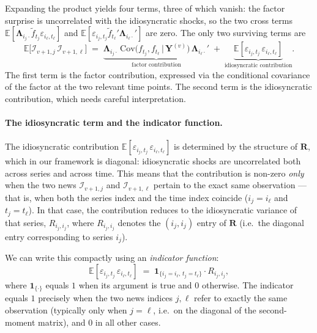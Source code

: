 \documentclass[11pt, a4paper, oneside]{article}
\begin{document}
Expanding the product yields four terms, three of which vanish: the
factor surprise is uncorrelated with the idiosyncratic shocks, so
the two cross terms
$\mathbb{E}[\boldsymbol{\Lambda}_{i_j \cdot} \widetilde{f}_{t_j} \varepsilon_{i_\ell, t_\ell}]$
and
$\mathbb{E}[\varepsilon_{i_j, t_j} \widetilde{f}_{t_\ell}' \boldsymbol{\Lambda}_{i_\ell \cdot}']$
are zero. The only two surviving terms are
\begin{equation}
\mathbb{E}\!\big[\mathcal{I}_{v+1, j}\, \mathcal{I}_{v+1, \ell}\big] \;=\;
\underbrace{\boldsymbol{\Lambda}_{i_j \cdot} \,
\mathrm{Cov}\!\big(f_{t_j}, f_{t_\ell} \,\big|\, \mathbf{Y}^{(v)}\big) \,
\boldsymbol{\Lambda}_{i_\ell \cdot}'}_{\text{factor contribution}}
\;+\;
\underbrace{\mathbb{E}[\varepsilon_{i_j, t_j}\, \varepsilon_{i_\ell, t_\ell}]}_{\text{idiosyncratic contribution}}.
\label{eq:second-moment-news-expanded}
\end{equation}
The first term is the factor contribution, expressed via the
conditional covariance of the factor at the two relevant time
points. The second term is the idiosyncratic contribution, which
needs careful interpretation.

\paragraph{The idiosyncratic term and the indicator function.}
The idiosyncratic contribution
$\mathbb{E}[\varepsilon_{i_j, t_j}\, \varepsilon_{i_\ell, t_\ell}]$
is determined by the structure of $\mathbf{R}$, which in our
framework is diagonal: idiosyncratic shocks are uncorrelated both
across series and across time. This means that the contribution is
non-zero \emph{only} when the two news $\mathcal{I}_{v+1, j}$ and
$\mathcal{I}_{v+1, \ell}$ pertain to the exact same observation —
that is, when both the series index and the time index coincide
($i_j = i_\ell$ and $t_j = t_\ell$). In that case, the contribution
reduces to the idiosyncratic variance of that series,
$R_{i_j, i_j}$, where $R_{i_j, i_j}$ denotes the $(i_j, i_j)$ entry
of $\mathbf{R}$ (i.e.\ the diagonal entry corresponding to series
$i_j$).

We can write this compactly using an \emph{indicator function}:
\[
\mathbb{E}[\varepsilon_{i_j, t_j}\, \varepsilon_{i_\ell, t_\ell}] \;=\;
\mathbf{1}_{\{i_j = i_\ell,\, t_j = t_\ell\}} \cdot R_{i_j, i_j},
\]
where $\mathbf{1}_{\{\cdot\}}$ equals $1$ when its argument is true
and $0$ otherwise. The indicator equals $1$ precisely when the two
news indices $j, \ell$ refer to exactly the same observation
(typically only when $j = \ell$, i.e.\ on the diagonal of the
second-moment matrix), and $0$ in all other cases.
\end{document}
